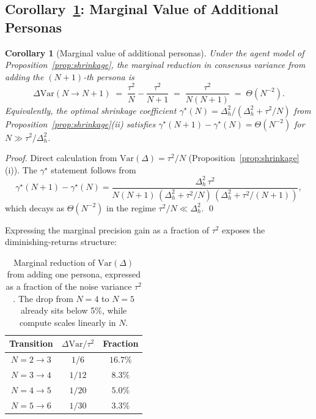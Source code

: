 \documentclass{article}
\newtheorem{corollary}[theorem]{Corollary}
\begin{document}
\subsection*{Corollary~\ref*{cor:persona-count}: Marginal Value of Additional Personas}

\begin{corollary}[Marginal value of additional personas]
\label{cor:persona-count}
Under the agent model of Proposition~\ref{prop:shrinkage}, the marginal reduction in consensus variance from adding the $(N{+}1)$-th persona is
\begin{equation}
\Delta\mathrm{Var}(N \to N{+}1) \;=\; \frac{\tau^2}{N} - \frac{\tau^2}{N+1} \;=\; \frac{\tau^2}{N(N+1)} \;=\; \Theta(N^{-2}).
\label{eq:marginal-persona}
\end{equation}
Equivalently, the optimal shrinkage coefficient $\gamma^\star(N) = \Delta_h^2/(\Delta_h^2 + \tau^2/N)$ from Proposition~\ref{prop:shrinkage}(ii) satisfies $\gamma^\star(N{+}1) - \gamma^\star(N) = \Theta(N^{-2})$ for $N \gg \tau^2/\Delta_h^2$.
\end{corollary}

\begin{proof}
Direct calculation from $\mathrm{Var}(\Delta) = \tau^2/N$ (Proposition~\ref{prop:shrinkage}(i)). The $\gamma^\star$ statement follows from
\begin{equation*}
\gamma^\star(N{+}1) - \gamma^\star(N) 
= \frac{\Delta_h^2\,\tau^2}{N(N+1)\,(\Delta_h^2 + \tau^2/N)\,(\Delta_h^2 + \tau^2/(N{+}1))},
\end{equation*}
which decays as $\Theta(N^{-2})$ in the regime $\tau^2/N \ll \Delta_h^2$. \qed
\end{proof}

Expressing the marginal precision gain as a fraction of $\tau^2$ exposes the diminishing-returns structure:

\begin{table}[H]
\centering\small
\caption{Marginal reduction of $\mathrm{Var}(\Delta)$ from adding one persona, expressed as a fraction of the noise variance $\tau^2$. The drop from $N{=}4$ to $N{=}5$ already sits below 5\%, while compute scales linearly in $N$.}
\label{tab:persona-marginal}
\setlength{\tabcolsep}{8pt}
\begin{tabular}{ccc}\toprule
Transition & $\Delta\mathrm{Var}/\tau^2$ & Fraction \\\midrule
$N{=}2 \to 3$ & $1/6$ & $16.7\%$ \\
$N{=}3 \to 4$ & $1/12$ & $8.3\%$ \\
$N{=}4 \to 5$ & $1/20$ & $5.0\%$ \\
$N{=}5 \to 6$ & $1/30$ & $3.3\%$ \\
\bottomrule\end{tabular}
\end{table}
\end{document}
